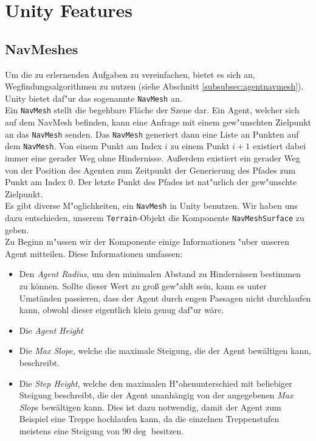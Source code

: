 \section{Unity Features}

\subsection{NavMeshes}

Um die zu erlernenden Aufgaben zu vereinfachen, bietet es sich an, Wegfindungsalgorithmen zu nutzen (siehe Abschnitt \ref{subsubsec:agentnavmesh}). Unity bietet daf"ur das sogenannte \texttt{NavMesh} an.
\\
Ein \texttt{NavMesh} stellt die begehbare Fläche der Szene dar. Ein Agent, welcher sich auf dem NavMesh befinden, kann eine Anfrage mit einem gew"unschten Zielpunkt an das \texttt{NavMesh} senden. Das \texttt{NavMesh} generiert dann eine Liste an Punkten auf dem \texttt{NavMesh}. Von einem Punkt am Index $i$ zu einem Punkt $i+1$ existiert dabei immer eine gerader Weg ohne Hindernisse. Außerdem existiert ein gerader Weg von der Position des Agenten zum Zeitpunkt der Generierung des Pfades zum Punkt am Index $0$. Der letzte Punkt des Pfades ist nat"urlich der gew"unschte Zielpunkt.
\\
Es gibt diverse M"oglichkeiten, ein \texttt{NavMesh} in Unity benutzen. Wir haben uns dazu entschieden, unserem \texttt{Terrain}-Objekt die Komponente \texttt{NavMeshSurface} zu geben.
\\
Zu Beginn m"ussen wir der Komponente einige Informationen "uber unseren Agent mitteilen. Diese Informationen umfassen:
\begin{itemize}
	\item Den \textit{Agent Radius}, um den minimalen Abstand zu Hindernissen bestimmen zu können. Sollte dieser Wert zu groß gew"ahlt sein, kann es unter Umständen passieren, dass der Agent durch engen Passagen nicht durchlaufen kann, obwohl dieser eigentlich klein genug daf"ur wäre.
	\item Die \textit{Agent Height}
	\item Die \textit{Max Slope}, welche die maximale Steigung, die der Agent bewältigen kann, beschreibt.
	\item Die \textit{Step Height}, welche den maximalen H"ohenunterschied mit beliebiger Steigung beschreibt, die der Agent unanhängig von der angegebenen \textit{Max Slope} bewältigen kann. Dies ist dazu notwendig, damit der Agent zum Beispiel eine Treppe hochlaufen kann, da die einzelnen Treppenstufen meistens eine Steigung von $90\deg$ besitzen.
\end{itemize}
